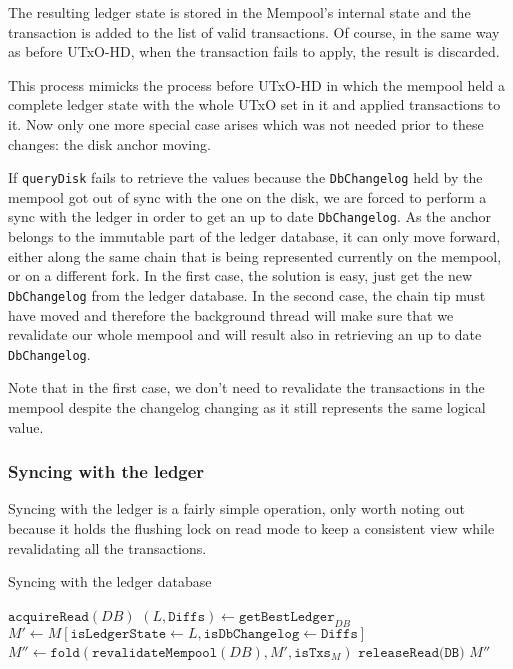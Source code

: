 \documentclass[11pt,a4paper]{article}
\theoremstyle{definition}
\begin{document}
The resulting ledger state is stored in the Mempool's internal state and the
transaction is added to the list of valid transactions. Of course, in the same
way as before UTxO-HD, when the transaction fails to apply, the result is
discarded.

This process mimicks the process before UTxO-HD in which the mempool held a
complete ledger state with the whole UTxO set in it and applied transactions to
it. Now only one more special case arises which was not needed prior to these
changes: the disk anchor moving.

If \texttt{queryDisk} fails to retrieve the values because the
\texttt{DbChangelog} held by the mempool got out of sync with the one on the
disk, we are forced to perform a sync with the ledger in order to get an up to
date \texttt{DbChangelog}. As the anchor belongs to the immutable part of the
ledger database, it can only move forward, either along the same chain that is
being represented currently on the mempool, or on a different fork. In the first
case, the solution is easy, just get the new \texttt{DbChangelog} from the
ledger database. In the second case, the chain tip must have moved and therefore
the background thread will make sure that we revalidate our whole mempool and
will result also in retrieving an up to date \texttt{DbChangelog}.

Note that in the first case, we don't need to revalidate the transactions in the
mempool despite the changelog changing as it still represents the same logical
value.

\subsubsection{Syncing with the ledger}

Syncing with the ledger is a fairly simple operation, only worth noting out
because it holds the flushing lock on read mode to keep a consistent view while
revalidating all the transactions.

\begin{algorithm}
  \caption{Syncing with the ledger database}
  \label{alg:sync}
  \begin{algorithmic}[1]
    \State $\texttt{acquireRead}(DB)$
    \State $(L, \texttt{Diffs}) \gets \texttt{getBestLedger}_{DB}$
    \State $M' \gets M [ \texttt{isLedgerState} \gets L, \texttt{isDbChangelog} \gets \texttt{Diffs}] $
    \State $M'' \gets \texttt{fold}(\texttt{revalidateMempool}(DB), M', \texttt{isTxs}_{M})$
    \State $\texttt{releaseRead(DB)}$
    \State \Return $M''$
    \EndProcedure
 \end{algorithmic}
\end{algorithm}
\end{document}

